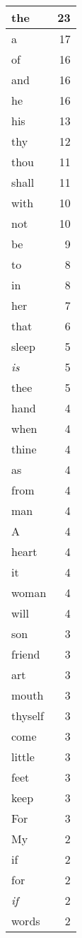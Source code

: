 \begin{center}
\begin{longtable}{l|r}
the & 23\\ \hline 
a & 17\\ \hline 
of & 16\\ \hline 
and & 16\\ \hline 
he & 16\\ \hline 
his & 13\\ \hline 
thy & 12\\ \hline 
thou & 11\\ \hline 
shall & 11\\ \hline 
with & 10\\ \hline 
not & 10\\ \hline 
be & 9\\ \hline 
to & 8\\ \hline 
in & 8\\ \hline 
her & 7\\ \hline 
that & 6\\ \hline 
sleep & 5\\ \hline 
\emph{is} & 5\\ \hline 
thee & 5\\ \hline 
hand & 4\\ \hline 
when & 4\\ \hline 
thine & 4\\ \hline 
as & 4\\ \hline 
from & 4\\ \hline 
man & 4\\ \hline 
A & 4\\ \hline 
heart & 4\\ \hline 
it & 4\\ \hline 
woman & 4\\ \hline 
will & 4\\ \hline 
son & 3\\ \hline 
friend & 3\\ \hline 
art & 3\\ \hline 
mouth & 3\\ \hline 
thyself & 3\\ \hline 
come & 3\\ \hline 
little & 3\\ \hline 
feet & 3\\ \hline 
keep & 3\\ \hline 
For & 3\\ \hline 
My & 2\\ \hline 
if & 2\\ \hline 
for & 2\\ \hline 
\emph{if} & 2\\ \hline 
words & 2\\ \hline 

\end{longtable}
\end{center}
